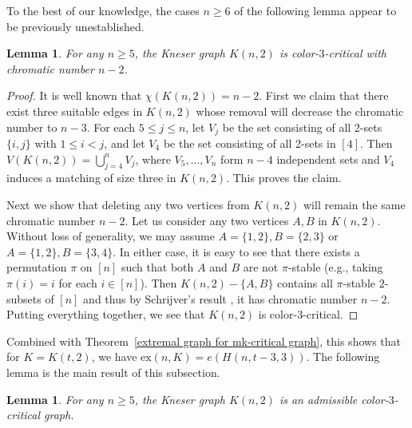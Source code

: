 \documentclass[10pt]{article}
\newtheorem{lemma}[theorem]{Lemma}
\def\ex{\mathrm{ex}}
\begin{document}
To the best of our knowledge, the cases $n\geq 6$ of the following lemma appear to be previously unestablished.

\begin{lemma}\label{Lem:K(n,2)}
For any $n\geq 5$, the Kneser graph $K(n,2)$ is color-$3$-critical with chromatic number $n-2$.
\end{lemma}

\begin{proof}
It is well known that $\chi(K(n,2))=n-2$.
First we claim that there exist three suitable edges in $K(n,2)$ whose removal will decrease the chromatic number to $n-3$.
For each $5\leq j\leq n$, let $V_j$ be the set consisting of all 2-sets $\{i,j\}$ with $1\leq i<j$,
and let $V_4$ be the set consisting of all 2-sets in $[4]$.
Then $V(K(n,2))=\bigcup_{j=4}^n V_j$, where $V_5,..., V_n$ form $n-4$ independent sets and $V_4$ induces a matching of size three in $K(n,2)$.
This proves the claim.

Next we show that deleting any two vertices from $K(n,2)$ will remain the same chromatic number $n-2$.
Let us consider any two vertices $A,B$ in $K(n,2)$.
Without loss of generality, we may assume $A=\{1,2\}, B=\{2,3\}$ or $A=\{1,2\}, B=\{3,4\}$.
In either case, it is easy to see that there exists a permutation $\pi$ on $[n]$ such that both $A$ and $B$ are not $\pi$-stable (e.g., taking $\pi(i)=i$ for each $i\in [n]$).
Then $K(n,2)-\{A,B\}$ contains all $\pi$-stable $2$-subsets of $[n]$ and thus by Schrijver's result \cite{Sch78}, it has chromatic number $n-2$.
Putting everything together, we see that $K(n,2)$ is color-$3$-critical.
\end{proof}

Combined with Theorem~\ref{extremal graph for mk-critical graph},
this shows that for $K=K(t,2)$, we have $\ex(n,K)=e(H(n,t-3,3)).$
The following lemma is the main result of this subsection.

\begin{lemma}\label{Lem2:K(n,2)}
For any $n\geq 5$, the Kneser graph $K(n,2)$ is an admissible color-$3$-critical graph.
\end{lemma}
\end{document}
